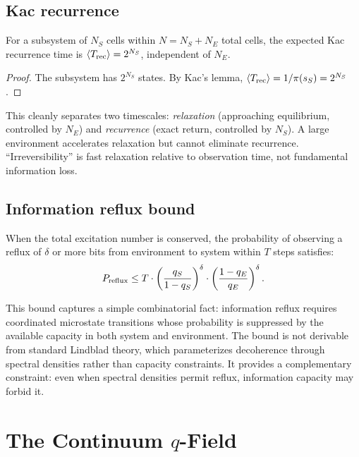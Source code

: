 \documentclass[reprint]{revtex4-2}
\begin{document}
\subsection{Kac recurrence}

\begin{theorem}
For a subsystem of $N_S$ cells within $N=N_S+N_E$ total cells, the expected Kac recurrence time is $\langle T_{\rm rec}\rangle = 2^{N_S}$, independent of $N_E$.
\end{theorem}
\begin{proof}
The subsystem has $2^{N_S}$ states. By Kac's lemma, $\langle T_{\rm rec}\rangle = 1/\pi(s_S) = 2^{N_S}$.
\end{proof}

This cleanly separates two timescales: \emph{relaxation} (approaching equilibrium, controlled by $N_E$) and \emph{recurrence} (exact return, controlled by $N_S$). A large environment accelerates relaxation but cannot eliminate recurrence. ``Irreversibility'' is fast relaxation relative to observation time, not fundamental information loss.

\subsection{Information reflux bound}

\begin{theorem}
When the total excitation number is conserved, the probability of observing a reflux of $\delta$ or more bits from environment to system within $T$ steps satisfies:
\begin{equation}
P_{\rm reflux} \le T\cdot\left(\frac{q_S}{1-q_S}\right)^\delta\cdot\left(\frac{1-q_E}{q_E}\right)^\delta.
\end{equation}
\end{theorem}

This bound captures a simple combinatorial fact: information reflux requires coordinated microstate transitions whose probability is suppressed by the available capacity in both system and environment. The bound is not derivable from standard Lindblad theory, which parameterizes decoherence through spectral densities rather than capacity constraints. It provides a complementary constraint: even when spectral densities permit reflux, information capacity may forbid it.

\section{The Continuum $q$-Field}
\end{document}
